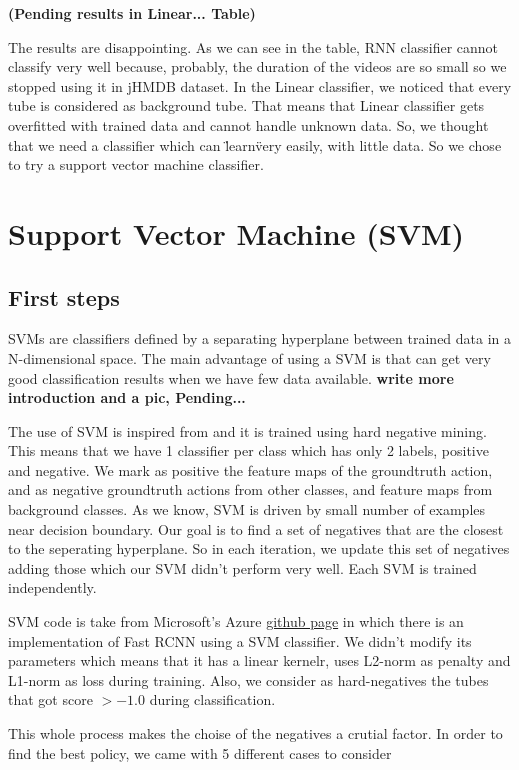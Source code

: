 \textbf{(Pending results in Linear... Table)}

The results are disappointing.
As we can see in the table, RNN classifier cannot classify very well because, probably, the duration of the videos are so small
so we stopped using it in jHMDB dataset. In the Linear classifier, we noticed that every tube is considered as background tube.
That means that Linear classifier gets overfitted with trained data and cannot handle unknown data. So, we thought that we
need a classifier which can \"learn\" very easily, with little data. So we chose to try a support vector machine classifier.

\section{Support Vector Machine (SVM)}
\subsection{First steps}
SVMs are classifiers defined by a separating hyperplane between trained data in a N-dimensional space. The main advantage of using a SVM
is that can get very good classification results when we have few data available. 
\textbf{write more introduction and a pic, Pending...} \par
The use of SVM is inspired from \cite{Girshick:2015:FR:2919332.2920125} and it is trained using hard negative mining. 
This means that we have 1 classifier per class which has only 2 labels, positive and negative. We mark as positive the feature maps of the
groundtruth action, and as negative groundtruth actions from other classes, and feature maps from background classes.
As we know, SVM is driven by small number of examples near decision boundary. Our goal is to find a set of negatives that are the closest to
the seperating hyperplane. So in each iteration, we update this set of negatives adding those which our SVM didn't perform very well. Each
SVM is trained independently. \par
SVM code is take from Microsoft's Azure \href{https://github.com/Azure/ObjectDetectionUsingCntk} {github page} in which there is an implementation
of Fast RCNN using a SVM classifier. We didn't modify its parameters which means that it has a linear kernelr, uses  L2-norm as penalty and L1-norm
as loss during training. Also, we consider as hard-negatives the tubes that got score $ >  -1.0 $ during classification.\par
This whole process makes the choise of the negatives a crutial factor. In order to find the best policy,  we came with 5 different cases to consider
